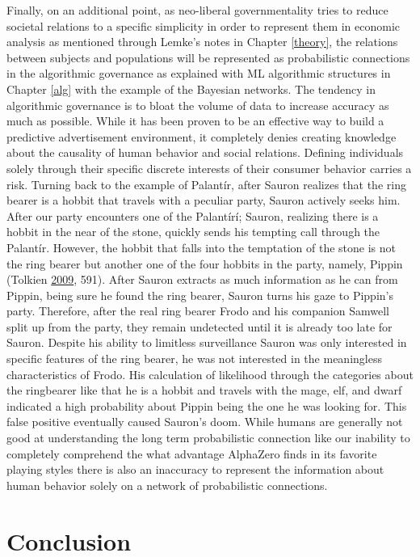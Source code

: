 \documentclass[12pt,twoside]{report}
\begin{document}
Finally, on an additional point, as neo-liberal governmentality tries to reduce societal relations to a specific simplicity in order to represent them in economic analysis as mentioned through Lemke's notes in Chapter \ref{theory}, the relations between subjects and populations will be represented as probabilistic connections in the algorithmic governance as explained with ML algorithmic structures in Chapter \ref{alg} with the example of the Bayesian networks. The tendency in algorithmic governance is to bloat the volume of data to increase accuracy as much as possible. While it has been proven to be an effective way to build a predictive advertisement environment, it completely denies creating knowledge about the causality of human behavior and social relations. Defining individuals solely through their specific discrete interests of their consumer behavior carries a risk. Turning back to the example of Palantír, after Sauron realizes that the ring bearer is a hobbit that travels with a peculiar party, Sauron actively seeks him. After our party encounters one of the Palantírí; Sauron, realizing there is a hobbit in the near of the stone, quickly sends his tempting call through the Palantír. However, the hobbit that falls into the temptation of the stone is not the ring bearer but another one of the four hobbits in the party, namely, Pippin (Tolkien \protect\hyperlink{ref-Tolkien2009}{2009}, 591). After Sauron extracts as much information as he can from Pippin, being sure he found the ring bearer, Sauron turns his gaze to Pippin's party. Therefore, after the real ring bearer Frodo and his companion Samwell split up from the party, they remain undetected until it is already too late for Sauron. Despite his ability to limitless surveillance Sauron was only interested in specific features of the ring bearer, he was not interested in the meaningless characteristics of Frodo. His calculation of likelihood through the categories about the ringbearer like that he is a hobbit and travels with the mage, elf, and dwarf indicated a high probability about Pippin being the one he was looking for. This false positive eventually caused Sauron's doom. While humans are generally not good at understanding the long term probabilistic connection like our inability to completely comprehend the what advantage AlphaZero finds in its favorite playing styles there is also an inaccuracy to represent the information about human behavior solely on a network of probabilistic connections.

\hypertarget{conclusion}{%
\chapter{Conclusion}\label{conclusion}}
\end{document}

